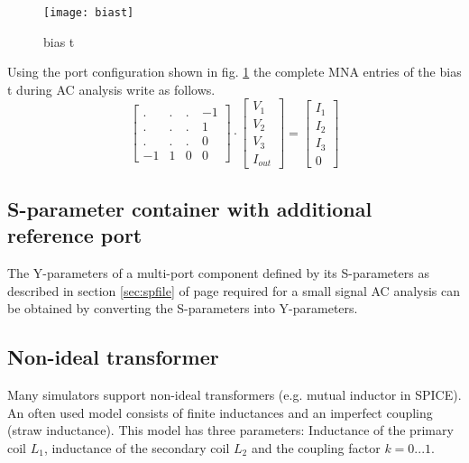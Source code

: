 \begin{figure}[ht]
\begin{center}
\texttt{[image: biast]}
\end{center}
\caption{bias t}
\label{fig:ACbiast}
\end{figure}
\FloatBarrier

Using the port configuration shown in fig. \ref{fig:ACbiast} the
complete MNA entries of the bias t during AC analysis write as
follows.
\begin{equation}
\begin{bmatrix}
 . & . & .  & -1\\
 . & . & .  &  1\\
 . & . & .  &  0\\
-1 & 1 & 0  &  0
\end{bmatrix}
\cdot
\begin{bmatrix}
V_{1}\\
V_{2}\\
V_{3}\\
I_{out}
\end{bmatrix}
=
\begin{bmatrix}
I_{1}\\
I_{2}\\
I_{3}\\
0
\end{bmatrix}
\end{equation}

\subsection{S-parameter container with additional reference port}

The Y-parameters of a multi-port component defined by its S-parameters
as described in section \ref{sec:spfile} of page \pageref{sec:spfile}
required for a small signal AC analysis can be obtained by converting
the S-parameters into Y-parameters.

\subsection{Non-ideal transformer}

Many simulators support non-ideal transformers (e.g. mutual inductor
in SPICE).  An often used model consists of finite inductances and an
imperfect coupling (straw inductance).  This model has three
parameters: Inductance of the primary coil $L_1$, inductance of the
secondary coil $L_2$ and the coupling factor $k=0...1$.

